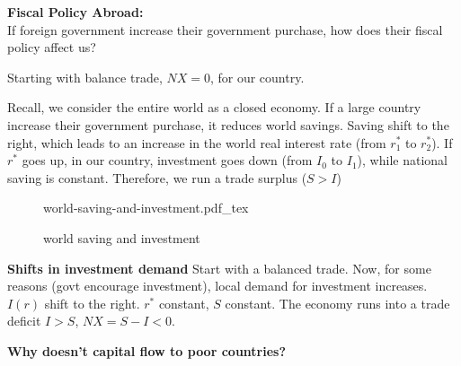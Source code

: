 \documentclass[12pt]{article}
\newcommand{\incfig}[1]{%
\def\svgwidth{\columnwidth}
{#1.pdf_tex}
}
\begin{document}
{\textbf {Fiscal Policy Abroad:}}\\
If foreign government increase their government purchase, how does their fiscal
policy affect us?

Starting with balance trade, $ NX = 0 $, for our country.

Recall, we consider the entire world as a closed economy. 
If a large country increase their government purchase, it reduces world savings.
Saving shift to the right, which leads to an increase in the world real interest rate
(from $ r_1^{*} $ to $ r_2^{*} $).
If $ r^{*} $ goes up, in our country, investment goes down (from $ I_0 $ to $ I_1 $),
while national saving
is constant. Therefore, we run a trade surplus ($ S > I $)

\begin{figure}[ht]
    \centering
    \incfig{world-saving-and-investment}
    \caption{world saving and investment}
    \label{fig:world-saving-and-investment}
\end{figure}



{\textbf {Shifts in investment demand}}
Start with a balanced trade.
Now, for some reasons (govt encourage investment), local demand for investment 
increases. $ I(r) $ shift to the right. $ r^{*} $ constant, $ S $ constant.
The economy runs into a trade deficit $ I > S $, $ NX = S - I < 0 $. 

\begin{figure}[H]
\end{figure}



{\textbf {Why doesn't capital flow to poor countries?}}
\end{document}
